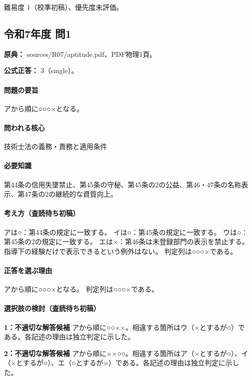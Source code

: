 \par 難易度 1（校準初稿）、優先度未評価。

\subsection{令和7年度 問1}
\label{q:r07-reg-apt-01}

\noindent\textbf{原典：} sources/R07/aptitude.pdf、PDF物理1頁。

\textbf{公式正答：} 3（single）。

\paragraph{問題の要旨} アから順に○○○×となる。

\paragraph{問われる核心} 技術士法の義務・責務と適用条件

\paragraph{必要知識} 第44条の信用失墜禁止、第45条の守秘、第45条の2の公益、第46・47条の名称表示、第47条の2の継続的な資質向上。

\paragraph{考え方（査読待ち初稿）} アは○：第44条の規定に一致する。 イは○：第45条の規定に一致する。 ウは○：第45条の2の規定に一致する。 エは×：第46条は未登録部門の表示を禁止する。指導下の経験だけで表示できるという例外はない。 判定列は○○○×である。

\paragraph{正答を選ぶ理由} アから順に○○○×となる。  判定列は○○○×である。

\paragraph{選択肢の検討（査読待ち初稿）}

\noindent\textbf{1：不適切な解答候補} アから順に○○××。相違する箇所はウ（×とするが○）である。各記述の理由は独立判定に示した。\par

\noindent\textbf{2：不適切な解答候補} アから順に××○○。相違する箇所はア（×とするが○）、イ（×とするが○）、エ（○とするが×）である。各記述の理由は独立判定に示した。\par

